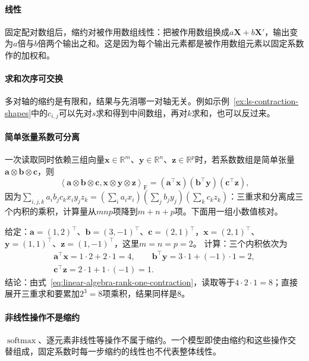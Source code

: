 \paragraph{线性}
固定配对数组后，缩约对被作用数组线性：把被作用数组换成$a\bm X+b\bm X'$，输出变为$a$倍与$b$倍两个输出之和。这是因为每个输出元素都是被作用数组元素以固定系数作的加权和。

\paragraph{求和次序可交换}
多对轴的缩约是有限和，结果与先消哪一对轴无关。例如示例~\ref{ex:ls-contraction-shapes}中的$c_{i,j}$可以先对$s$求和得到中间数组，再对$k$求和，也可以反过来。

\paragraph{简单张量系数可分离}
一次读取同时依赖三组向量$\bm x\in\mathbb R^m$、$\bm y\in\mathbb R^n$、$\bm z\in\mathbb R^p$时，若系数数组是简单张量$\bm a\otimes\bm b\otimes\bm c$，则
\begin{equation}
 \left\langle\bm a\otimes\bm b\otimes\bm c,
 \bm x\otimes\bm y\otimes\bm z\right\rangle_{\mathrm F}
 =(\bm a^\top\bm x)(\bm b^\top\bm y)(\bm c^\top\bm z),
 \label{eq:linear-algebra-rank-one-contraction}
\end{equation}
因为$\sum_{i,j,k}a_ib_jc_kx_iy_jz_k=(\sum_ia_ix_i)(\sum_jb_jy_j)(\sum_kc_kz_k)$：三重求和分离成三个内积的乘积，计算量从$mnp$项降到$m+n+p$项。下面用一组小数值核对。
\begin{example}[简单张量系数的分离计算]
\label{ex:ls-rank-one-contraction-check}
给定：$\bm a=(1,2)^\top$、$\bm b=(3,-1)^\top$、$\bm c=(2,1)^\top$，$\bm x=(2,1)^\top$、$\bm y=(1,1)^\top$、$\bm z=(1,-1)^\top$，这里$m=n=p=2$。
计算：三个内积依次为
\[
 \begin{gathered}
 \bm a^\top\bm x=1\cdot2+2\cdot1=4,\qquad
 \bm b^\top\bm y=3\cdot1+(-1)\cdot1=2,\\
 \bm c^\top\bm z=2\cdot1+1\cdot(-1)=1.
 \end{gathered}
\]
结论：由式~\eqref{eq:linear-algebra-rank-one-contraction}，读取等于$4\cdot2\cdot1=8$；直接展开三重求和要累加$2^3=8$项乘积，结果同样是$8$。
\end{example}

\paragraph{非线性操作不是缩约}
$\operatorname{softmax}$、逐元素非线性等操作不属于缩约。一个模型即使由缩约和这些操作交替组成，固定系数时每一步缩约的线性也不代表整体线性。

